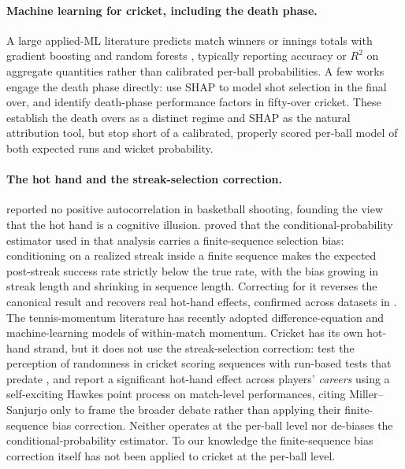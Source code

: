 \paragraph{Machine learning for cricket, including the death phase.}
A large applied-ML literature predicts match winners or innings totals with
gradient boosting and random forests \citep{raju2024dream11},
typically reporting accuracy or $R^2$ on aggregate quantities rather than
calibrated per-ball probabilities. A few works engage the death phase directly:
\citet{sahoo2024shot} use SHAP to model shot selection in the final over, and
\citet{jamil2023factors} identify death-phase performance factors in
fifty-over cricket. These establish the death overs as a distinct regime and SHAP
as the natural attribution tool, but stop short of a calibrated, properly scored
per-ball model of both expected runs and wicket probability.

\paragraph{The hot hand and the streak-selection correction.}
\citet{gilovich1985hothand} reported no positive autocorrelation in basketball
shooting, founding the view that the hot hand is a cognitive illusion.
\citet{miller2018surprised} proved that the conditional-probability estimator
used in that analysis carries a finite-sequence selection bias: conditioning on a
realized streak inside a finite sequence makes the expected
post-streak success rate strictly below the true rate, with the bias growing in
streak length and shrinking in sequence length. Correcting for it reverses the
canonical result and recovers real hot-hand effects, confirmed across datasets in
\citet{miller2024coldshower}. The tennis-momentum literature
\citep{wang2024momentum} has recently adopted difference-equation and
machine-learning models of within-match momentum. Cricket has its own hot-hand strand, but it does not use the
streak-selection correction: \citet{durbach2007cricket} test the perception of
randomness in cricket scoring sequences with run-based tests that predate
\citet{miller2018surprised}, and \citet{ram2022hothand} report a significant
hot-hand effect across players' \emph{careers} using a self-exciting Hawkes point
process on match-level performances, citing Miller--Sanjurjo only to frame the
broader debate rather than applying their finite-sequence bias correction. Neither
operates at the per-ball level nor de-biases the conditional-probability
estimator. To our knowledge the finite-sequence bias correction itself has not
been applied to cricket at the per-ball level.


